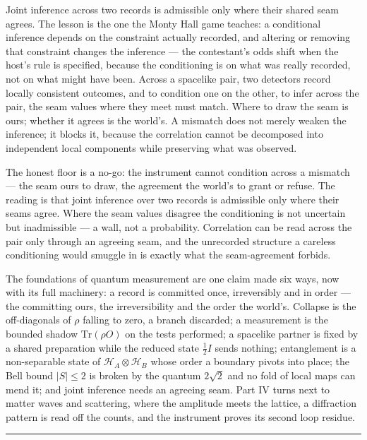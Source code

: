 Joint inference across two records is admissible only where their shared seam agrees. The lesson is the one
the Monty Hall game teaches: a conditional inference depends on the constraint actually recorded, and altering
or removing that constraint changes the inference --- the contestant's odds shift when the host's rule is
specified, because the conditioning is on what was really recorded, not on what might have been. Across a
spacelike pair, two detectors record locally consistent outcomes, and to condition one on the other, to infer
across the pair, the seam values where they meet must match. Where to draw the seam is ours; whether it agrees
is the world's. A mismatch does not merely weaken the inference;
it blocks it, because the correlation cannot be decomposed into independent local components while preserving
what was observed.

The honest floor is a no-go: the instrument cannot condition across a mismatch --- the seam ours to draw, the
agreement the world's to grant or refuse. The reading is that joint inference over
two records is admissible only where their seams agree. Where the seam values disagree the conditioning is not
uncertain but inadmissible --- a wall, not a probability. Correlation can be read across the pair only through
an agreeing seam, and the unrecorded structure a careless conditioning would smuggle in is exactly what the
seam-agreement forbids.

\bigskip

The foundations of quantum measurement are one claim made six ways, now with its full machinery: a record is
committed once, irreversibly and in order --- the committing ours, the irreversibility and the order the world's. Collapse is the off-diagonals of $\rho$ falling to zero, a branch
discarded; a measurement is the bounded shadow $\mathrm{Tr}(\rho O)$ on the tests performed; a spacelike
partner is fixed by a shared preparation while the reduced state $\tfrac12 I$ sends nothing; entanglement is a
non-separable state of $\mathcal{H}_A \otimes \mathcal{H}_B$ whose order a boundary pivots into place; the Bell
bound $|S| \le 2$ is broken by the quantum $2\sqrt2$ and no fold of local maps can mend it; and joint
inference needs an agreeing seam. Part IV turns next to matter waves and scattering, where the amplitude meets
the lattice, a diffraction pattern is read off the counts, and the instrument proves its second loop residue.

\bigskip
\begin{center}
\rule{0.4\textwidth}{0.4pt}
\end{center}
\bigskip

